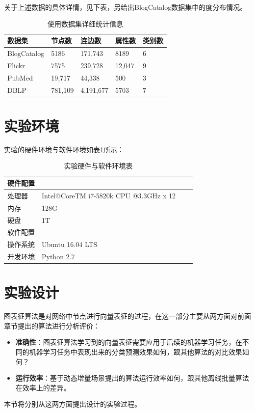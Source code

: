 关于上述数据的具体详情，见下表，另给出BlogCatalog数据集中的度分布情况。
\begin{table}
\centering
\caption{使用数据集详细统计信息}
\begin{tabular}{C{1in}C{1in}C{1in}C{1in}C{1in}}
\textbf{数据集} & \textbf{节点数} &\textbf{连边数} & \textbf{属性数}&\textbf{类别数}\\ \hline 
BlogCatalog & 5186  & 171,743 &8189&6\\
Flickr	& 7575 &239,728 & 12,047 & 9 \\
PubMed & 19,717 &44,338&500 &3 \\
DBLP & 781,109 &4,191,677&5703 & 7 \\
\hline

\end{tabular}
\end{table}

\section{实验环境}
实验的硬件环境与软件环境如表\ref{my-label5_1}所示：

\begin{table}[]
	\centering
	\caption{实验硬件与软件环境表}
	\label{my-label5_1}
	\begin{tabular}{@{}llll@{}}
		\toprule
		硬件配置\\ \midrule
		处理器&	Intel@CoreTM i7-5820k CPU @3.3GHz x 12\\ \midrule
		内存&	128G\\ \midrule
		硬盘&	1T\\ \midrule
		软件配置 \\ \midrule
		操作系统&	Ubuntu 16.04 LTS \\ \midrule
		开发环境&	Python 2.7  \\ \bottomrule
	\end{tabular}
\end{table}

\section{实验设计}
图表征算法是对网络中节点进行向量表征的过程，在这一部分主要从两方面对前面章节提出的算法进行分析评价：
\begin{itemize}
	\item \textbf{准确性}：图表征算法学习到的向量表征需要应用于后续的机器学习任务，在不同的机器学习任务中表现出来的分类预测效果如何，跟其他算法的对比效果如何？
	\item \textbf{运行效率}：基于动态增量场景提出的算法运行效率如何，跟其他离线批量算法在效率上的差异。
\end{itemize}
本节将分别从这两方面提出设计的实验过程。
